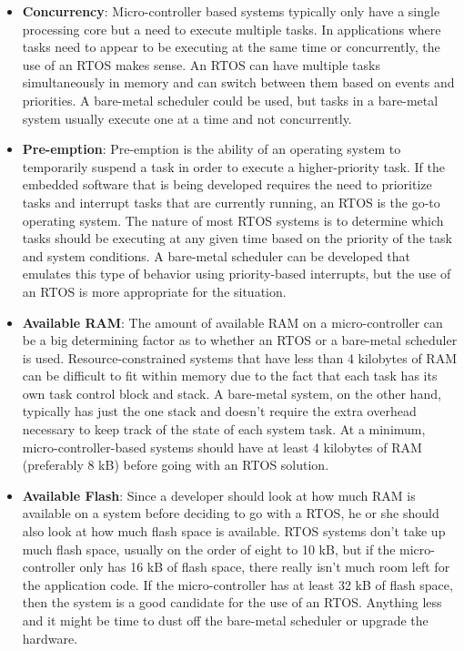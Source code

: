 \documentclass[12pt]{report}
\begin{document}
\begin{itemize}
    \item \textbf{Concurrency}: Micro-controller based systems typically only have a single processing core but a need to execute multiple tasks. In applications where tasks need to appear to be executing at the same time or concurrently, the use of an RTOS makes sense. An RTOS can have multiple tasks simultaneously in memory and can switch between them based on events and priorities. A bare-metal scheduler could be used, but tasks in a bare-metal system usually execute one at a time and not concurrently.
    \item \textbf{Pre-emption}: Pre-emption is the ability of an operating system to temporarily suspend a task in order to execute a higher-priority task. If the embedded software that is being developed requires the need to prioritize tasks and interrupt tasks that are currently running, an RTOS is the go-to operating system. The nature of most RTOS systems is to determine which tasks should be executing at any given time based on the priority of the task and system conditions. A bare-metal scheduler can be developed that emulates this type of behavior using priority-based interrupts, but the use of an RTOS is more appropriate for the situation.
    \item \textbf{Available RAM}: The amount of available RAM on a micro-controller can be a big determining factor as to whether an RTOS or a bare-metal scheduler is used. Resource-constrained systems that have less than 4 kilobytes of RAM can be difficult to fit within memory due to the fact that each task has its own task control block and stack. A bare-metal system, on the other hand, typically has just the one stack and doesn't require the extra overhead necessary to keep track of the state of each system task. At a minimum, micro-controller-based systems should have at least 4 kilobytes of RAM (preferably 8 kB) before going with an RTOS solution.
    \item \textbf{Available Flash}: Since a developer should look at how much RAM is available on a system before deciding to go with a RTOS, he or she should also look at how much flash space is available. RTOS systems don't take up much flash space, usually on the order of eight to 10 kB, but if the micro-controller only has 16 kB of flash space, there really isn't much room left for the application code. If the micro-controller has at least 32 kB of flash space, then the system is a good candidate for the use of an RTOS. Anything less and it might be time to dust off the bare-metal scheduler or upgrade the hardware.

\end{itemize}
\end{document}
